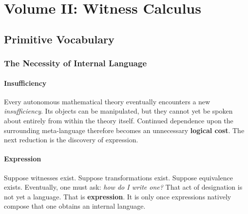 \documentclass[12pt,anyside]{book}
\begin{document}
\tableofcontents


\mainmatter



\part*{Volume II: Witness Calculus}


\chapter{Primitive Vocabulary}
\setlength{\parindent}{0pt}

\section{The Necessity of Internal Language}

\subsection{Insufficiency}
Every autonomous mathematical theory eventually encounters a new \textit{insufficiency}. Its objects can be manipulated, but they cannot yet be spoken about entirely from within the theory itself. Continued dependence upon the surrounding meta-language therefore becomes an unnecessary \textbf{logical cost}. The next reduction is the discovery of expression.

\subsection{Expression}
Suppose witnesses exist. Suppose transformations exist. Suppose equivalence exists. Eventually, one must ask: \textit{how do I write one?} That act of designation is not yet a language. That is \textbf{expression}. It is only once expressions natively compose that one obtains an internal language. 
\end{document}
